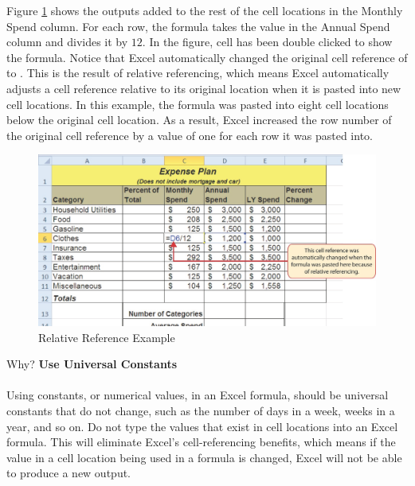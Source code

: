 Figure \ref{02:fig05} shows the outputs added to the rest of the cell locations in the Monthly Spend column. For each row, the formula takes the value in the Annual Spend column and divides it by $ 12 $. In the figure, cell  has been double clicked to show the formula. Notice that Excel automatically changed the original cell reference of  to . This is the result of relative referencing, which means Excel automatically adjusts a cell reference relative to its original location when it is pasted into new cell locations. In this example, the formula was pasted into eight cell locations below the original cell location. As a result, Excel increased the row number of the original cell reference by a value of one for each row it was pasted into.

\begin{figure}[H]
	\centering
	\includegraphics[width=\maxwidth{.95\linewidth}]{gfx/ch02_fig05}
	\caption{Relative Reference Example}
	\label{02:fig05}
\end{figure}

\begin{center}
	\begin{infobox}{Why?}
		\textbf{Use Universal Constants}
		\\
		\\
		Using constants, or numerical values, in an Excel formula, should be universal constants that do not change, such as the number of days in a week, weeks in a year, and so on. Do not type the values that exist in cell locations into an Excel formula. This will eliminate Excel's cell-referencing benefits, which means if the value in a cell location being used in a formula is changed, Excel will not be able to produce a new output.
	\end{infobox}
\end{center}

